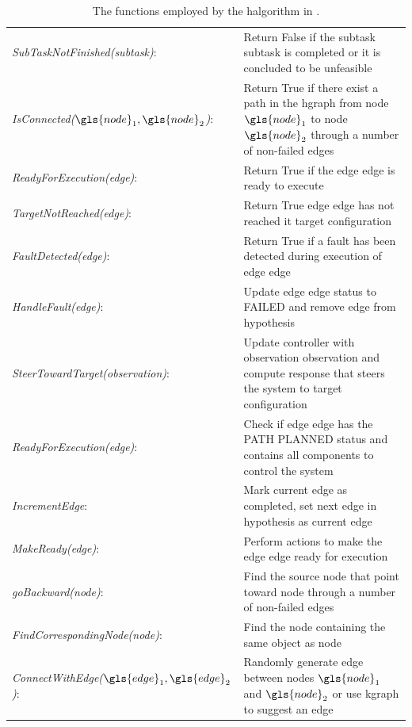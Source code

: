 \begin{table}[H]
\centering
\begin{tabular}%
  {>{\raggedright\arraybackslash}p{}%
   >{\raggedright\arraybackslash}p{}}
\textit{SubTaskNotFinished(\gls{subtask})}:& Return False if the subtask \gls{subtask} is completed or it is concluded to be unfeasible \\
\textit{IsConnected($\gls{node}_1, \gls{node}_2$)}:& Return True if there exist a path in the \ac{hgraph} from node $\gls{node}_1$  to node $\gls{node}_2$ through a number of non-failed edges\\
\textit{ReadyForExecution(\gls{edge})}: & Return True if the edge \gls{edge} is ready to execute\\
\textit{TargetNotReached(\gls{edge})}: & Return True edge \gls{edge} has not reached it target configuration\\
\textit{FaultDetected(\gls{edge})}: & Return True if a fault has been detected during execution of edge \gls{edge}\\

\textit{HandleFault(\gls{edge})}: & Update edge \gls{edge} status to FAILED and remove edge from hypothesis \\
\textit{SteerTowardTarget(\gls{observation})}: & Update controller with observation \gls{observation} and compute response that steers the system to target configuration\\
\textit{ReadyForExecution(\gls{edge})}: & Check if edge \gls{edge} has the PATH PLANNED status and contains all components to control the system \\
\textit{IncrementEdge}: & Mark current edge as completed, set next edge in \gls{hypothesis} as current edge \\
\textit{MakeReady(\gls{edge})}: & Perform actions to make the edge \gls{edge} ready for execution \\
\textit{goBackward(\gls{node})}: & Find the source node that point toward \gls{node} through a number of non-failed edges\\
\textit{FindCorrespondingNode(\gls{node})}: & Find the node containing the same object as \gls{node} \\
\textit{ConnectWithEdge($\gls{edge}_1, \gls{edge}_2$)}: & Randomly generate edge between nodes $\gls{node}_1$ and $\gls{node}_2$ or use \ac{kgraph} to suggest an edge\\
\end{tabular}
\caption{The functions employed by the \ac{halgorithm} in .}
\label{table:functions_for_halgorithm}
\end{table}

